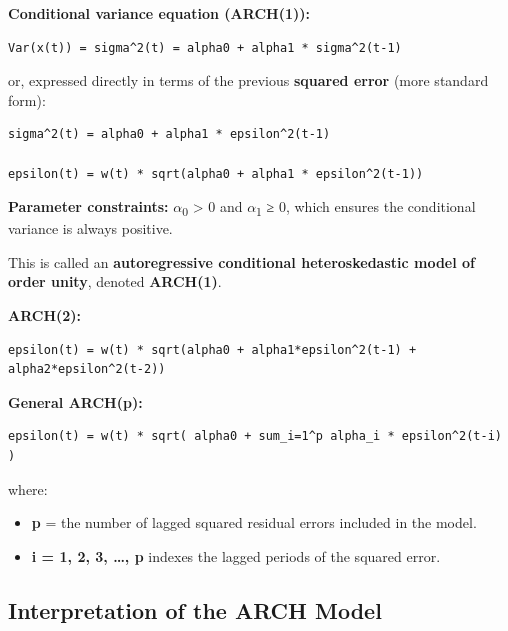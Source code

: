 \documentclass[12pt,openany]{book}
\theoremstyle{definition}
\theoremstyle{remark}
\begin{document}
\textbf{Conditional variance equation (ARCH(1)):}

\begin{lstlisting}[style=notesCode]
Var(x(t)) = sigma^2(t) = alpha0 + alpha1 * sigma^2(t-1)
\end{lstlisting}

or, expressed directly in terms of the previous \textbf{squared error} (more standard form):

\begin{lstlisting}[style=notesCode]
sigma^2(t) = alpha0 + alpha1 * epsilon^2(t-1)

epsilon(t) = w(t) * sqrt(alpha0 + alpha1 * epsilon^2(t-1))
\end{lstlisting}

\textbf{Parameter constraints:} \ensuremath{\alpha}\textsubscript{0} > 0 and \ensuremath{\alpha}\textsubscript{1} ≥ 0, which ensures the conditional variance is always positive.

This is called an \textbf{autoregressive conditional heteroskedastic model of order unity}, denoted \textbf{ARCH(1)}.

\textbf{ARCH(2):}

\begin{lstlisting}[style=notesCode]
epsilon(t) = w(t) * sqrt(alpha0 + alpha1*epsilon^2(t-1) + alpha2*epsilon^2(t-2))
\end{lstlisting}

\textbf{General ARCH(p):}

\begin{lstlisting}[style=notesCode]
epsilon(t) = w(t) * sqrt( alpha0 + sum_i=1^p alpha_i * epsilon^2(t-i) )
\end{lstlisting}

where:
\begin{itemize}
\item \textbf{p} = the number of lagged squared residual errors included in the model.
\item \textbf{i = 1, 2, 3, …, p} indexes the lagged periods of the squared error.
\end{itemize}

\subsection{Interpretation of the ARCH Model}
\end{document}
